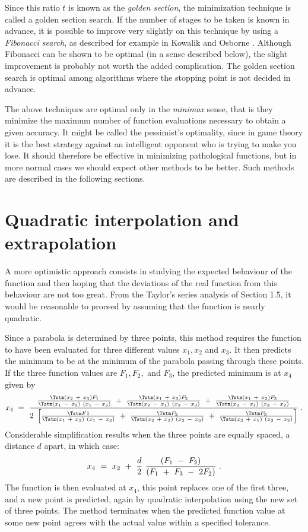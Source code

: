  
Since this ratio $t$ is known as the {\em golden section}, the minimization
technique is called a golden section search.
If the number of stages
to be taken is known in advance, it is possible to improve very slightly
on this technique by using a {\em Fibonacci search}, as described for example
in Kowalik and Osborne \cite{Kowa}.  Although Fibonacci can be shown to be optimal
(in a sense described below), the slight improvement is probably not
worth the added complication.  The golden section search is optimal
among algorithms where the stopping point is not decided in advance.
 
     The above techniques are optimal only in the {\em minimax} sense, that is
they minimize the maximum number of function evaluations necessary to
obtain a given accuracy.  It might be called the pessimist's optimality, 
since in game theory it is the best strategy against an intelligent
opponent who is trying to make you lose.  It should therefore be
effective
in minimizing pathological functions, but in more normal cases we should
expect other methods to be better.  Such methods are described in the
following sections.
 
 
\section{Quadratic interpolation and extrapolation}
 
     A more optimistic approach consists in studying the expected
behaviour of the function and then hoping that the deviations of the
real function from this behaviour are not too great.  From the Taylor's
series analysis of Section 1.5, it would be reasonable to proceed by
assuming that the function is nearly quadratic.
 
     Since a parabola is determined by three points, this method requires
the function to have been evaluated for three different values $x_1, x_2$
and $x_3$. It then predicts the minimum to be at the minimum of the
parabola passing through these points.  If the three function values are
$F_1, F_2,$ and $F_3$, the predicted minimum is at $x_4$ given by
 $$x_4~=~\frac%
      {{\Tstm (x_2~+~x_3)F_1\over\Tstm (x_1~-~x_2)~(x_1~-~x_3)}
  ~+~  {\Tstm (x_1~+~x_3)F_2\over\Tstm (x_2~-~x_1)~(x_2~-~x_3)}
  ~+~  {\Tstm (x_1~+~x_2)F_3\over\Tstm (x_3~-~x_1)~(x_3~-~x_2)}}%
  {2~\left[    {\Tstm F1 \over \Tstm (x_1~+~x_2)~(x_1~-~x_3)}
           ~+~ {\Tstm F_2\over \Tstm (x_2~+~x_3)~(x_2~-~x_3)}
           ~+~ {\Tstm F_3\over \Tstm (x_3~+~x_1)~(x_3~-~x_2)}
    \right]}~. $$ 
Considerable simplification results when the three points are equally
spaced, a distance $d$ apart, in which case:
$$x_4~=~x_2~+~{d\over 2}~{(F_1~-~F_2)\over
(F_1~+~F_3~-~2F_2)}~.$$  
 The function is then evaluated at $x_4$, this point replaces one of the
first three, and a new point is predicted, again by quadratic
interpolation using the new set of three points.
The method terminates when the
predicted function value at some new point agrees with the actual value
within a specified tolerance.
 
